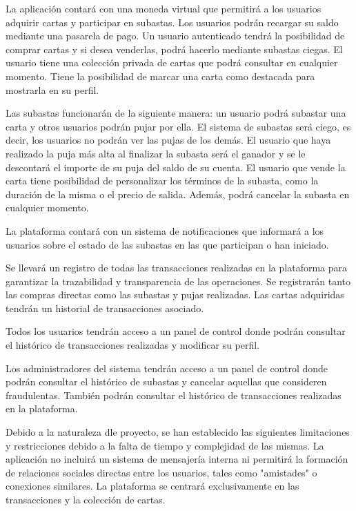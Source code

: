 La aplicación contará con una moneda virtual que permitirá a los usuarios adquirir cartas y participar en subastas. Los usuarios podrán recargar su saldo mediante una pasarela de pago.
Un usuario autenticado tendrá la posibilidad de comprar cartas y si desea venderlas, podrá hacerlo mediante subastas ciegas. 
El usuario tiene una colección privada de cartas que podrá consultar en cualquier momento. Tiene la posibilidad de marcar una carta como destacada para mostrarla en su perfil.

Las subastas funcionarán de la siguiente manera: un usuario podrá subastar una carta y otros usuarios podrán pujar por ella.
El sistema de subastas será ciego, es decir, los usuarios no podrán ver las pujas de los demás. 
El usuario que haya realizado la puja más alta al finalizar la subasta será el ganador y se le descontará el importe de su puja del saldo de su cuenta.
El usuario que vende la carta tiene posibilidad de personalizar los términos de la subasta, como la duración de la misma o el precio de salida. Además, podrá cancelar la subasta en cualquier momento.

La plataforma contará con un sistema de notificaciones que informará a los usuarios sobre el estado de las subastas en las que participan o han iniciado.

Se llevará un registro de todas las transacciones realizadas en la plataforma para garantizar la trazabilidad y transparencia de las operaciones. 
Se registrarán tanto las compras directas como las subastas y pujas realizadas. Las cartas adquiridas tendrán un historial de transacciones asociado.

Todos los usuarios tendrán acceso a un panel de control donde podrán consultar el histórico de transacciones realizadas y modificar su perfil.

Los administradores del sistema tendrán acceso a un panel de control donde podrán consultar el histórico de subastas y cancelar aquellas que consideren fraudulentas. 
También podrán consultar el histórico de transacciones realizadas en la plataforma.


Debido a la naturaleza dle proyecto, se han establecido las siguientes limitaciones y restricciones debido a la falta de tiempo y complejidad de las mismas.
La aplicación no incluirá un sistema de mensajería interna ni permitirá la formación de relaciones sociales directas entre los usuarios, tales como "amistades" o conexiones similares.
La plataforma se centrará exclusivamente en las transacciones y la colección de cartas.

